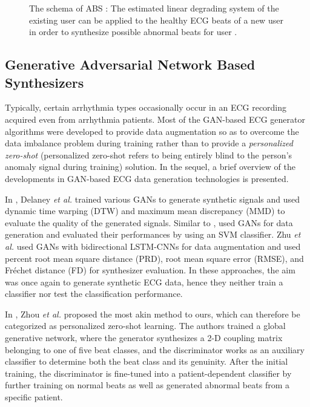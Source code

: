 \documentclass[journal,transmag]{IEEEtran}
\begin{document}
\begin{figure}[H]
\begin{tikzpicture}[x=0.60pt,y=0.75pt,yscale=-1,xscale=1]
\end{tikzpicture}

\caption{The schema of ABS \cite{kiranyaz2017personalized}: The estimated linear degrading system of the existing user  can be applied to the healthy ECG beats of a new user  in order to synthesize possible abnormal beats for user .}
\label{fig:linear_degrading_system}

\end{figure} 
\subsection{Generative Adversarial Network Based Synthesizers }
Typically, certain arrhythmia types occasionally occur in an ECG recording acquired even from arrhythmia patients. Most of the GAN-based ECG generator algorithms \cite{golany2019pgans,cab, ODE-GAN, simgans, wang2019ecg, shaker2020generalization}
were developed to provide data augmentation so as to  overcome the data imbalance problem during training rather than to provide a \textit{personalized zero-shot} (personalized zero-shot refers to being entirely blind to the person's anomaly signal during training) solution. In the sequel, a brief overview of the developments in GAN-based ECG data generation technologies is presented. 



In \cite{delaney2019synthesis}, Delaney \textit{et al.} trained various GANs to generate synthetic signals and used dynamic time warping (DTW) and maximum mean discrepancy (MMD) to evaluate the quality of the generated signals. Similar to \cite{delaney2019synthesis}, \cite{wulan2020generating} used GANs for data generation and evaluated their performances by using an SVM classifier. Zhu \textit{et al.} \cite{zhu2019electrocardiogram} used GANs with bidirectional LSTM-CNNs for data augmentation and used percent root mean square distance (PRD), root mean square error (RMSE), and Fréchet distance (FD) for synthesizer evaluation. In these approaches, the aim was once again to generate synthetic ECG data, hence they neither train a classifier nor test the classification performance.

In \cite{zhou2021fully}, Zhou \textit{et al.} proposed the most akin method to ours, which can therefore be categorized as personalized zero-shot learning. The authors trained a global generative network, where the generator synthesizes a 2-D coupling matrix belonging to one of five beat classes, and the discriminator works as an auxiliary classifier to determine both the beat class and its genuinity. After the initial training, the discriminator is fine-tuned into a patient-dependent classifier by further training on normal beats as well as generated abnormal beats from a specific patient.
\end{document}
